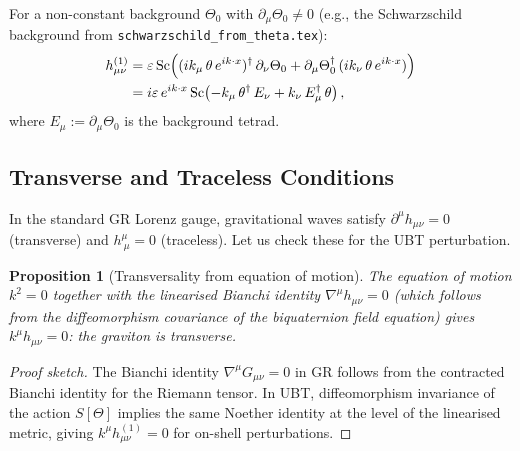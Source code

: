 \documentclass[11pt,a4paper]{article}
\newtheorem{proposition}[theorem]{Proposition}
\theoremstyle{definition}
\theoremstyle{remark}
\begin{document}
For a non-constant background $\Theta_0$ with $\partial_\mu\Theta_0 \neq 0$
(e.g., the Schwarzschild background from \texttt{schwarzschild\_from\_theta.tex}):
\begin{align}
  h_{\mu\nu}^{(1)}
  &= \varepsilon\,\mathrm{Sc}\!\left(
     (ik_\mu\,\theta\,e^{ik\cdot x})^\dagger\,\partial_\nu\Theta_0
     + \partial_\mu\Theta_0^\dagger\,(ik_\nu\,\theta\,e^{ik\cdot x})
    \right)
  \notag\\
  &= i\varepsilon\,e^{ik\cdot x}\,\mathrm{Sc}\!\left(
     -k_\mu\,\theta^\dagger\,E_\nu + k_\nu\,E_\mu^\dagger\,\theta
    \right),
  \label{eq:h_munu_nonconstant}
\end{align}
where $E_\mu := \partial_\mu\Theta_0$ is the background tetrad.

\subsection{Transverse and Traceless Conditions}

In the standard GR Lorenz gauge, gravitational waves satisfy $\partial^\mu h_{\mu\nu} = 0$
(transverse) and $h^\mu_{\ \mu} = 0$ (traceless).  Let us check these for
the UBT perturbation.

\begin{proposition}[Transversality from equation of motion]
\label{prop:transverse}
The equation of motion $k^2 = 0$ together with the linearised Bianchi
identity $\nabla^\mu h_{\mu\nu} = 0$ (which follows from the diffeomorphism
covariance of the biquaternion field equation) gives $k^\mu h_{\mu\nu} = 0$:
the graviton is transverse.
\end{proposition}

\begin{proof}[Proof sketch]
The Bianchi identity $\nabla^\mu G_{\mu\nu} = 0$ in GR follows from the
contracted Bianchi identity for the Riemann tensor.  In UBT, diffeomorphism
invariance of the action $S[\Theta]$ implies the same Noether identity at
the level of the linearised metric, giving $k^\mu h_{\mu\nu}^{(1)} = 0$ for
on-shell perturbations.
\end{proof}
\end{document}
